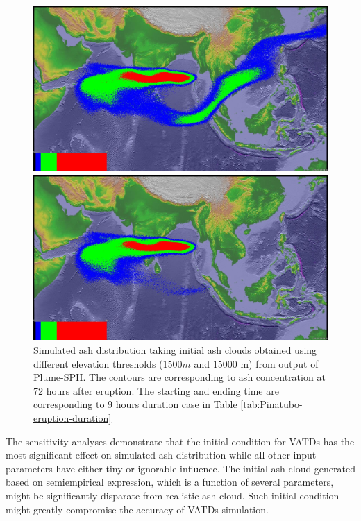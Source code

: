 \begin{figure}[!htb]
    \centering
    \begin{minipage}{.325\textwidth}
        \centering
        \includegraphics[width=0.99 \textwidth]{Chapter-7/Figures/199106180441-ash-9hr-cut1500}
    \end{minipage}%
    \begin{minipage}{.325 \textwidth}
        \centering
        \includegraphics[width=0.99 \textwidth]{Chapter-7/Figures/199106180441-ash-9hr-cut15000}
    \end{minipage}%
    \caption{Simulated ash distribution taking initial ash clouds obtained using different elevation thresholds ($1500 m$ and $15000$ m) from output of Plume-SPH. The contours are corresponding to ash concentration at 72 hours after eruption. The starting and ending time are corresponding to 9 hours duration case in Table \ref{tab:Pinatubo-eruption-duration}}
    \label{fig:PUFF-sensitivity-elevation-threshold}
\end{figure}

The sensitivity analyses demonstrate that the initial condition for VATDs has the most significant effect on simulated ash distribution while all other input parameters have either tiny or ignorable influence. The initial ash cloud generated based on semiempirical expression, which is a function of several parameters, might be significantly disparate from realistic ash cloud. Such initial condition might greatly compromise the accuracy of VATDs simulation.


